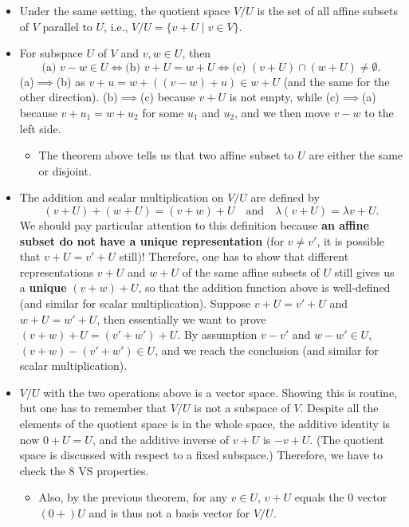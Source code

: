\documentclass{article}
\begin{document}
\begin{itemize}
\begin{itemize}
    \end{itemize}
    \item Under the same setting, the quotient space $V/U$ is the set of all affine subsets of $V$ parallel to $U$, i.e., $V/U = \{v+U \mid v \in V\}$.
    \item For subspace $U$ of $V$ and $v,w \in U$, then
        \begin{equation*}
            \text{(a) } v-w \in U \iff \text{(b) } v+U = w+U \iff \text{(c) } (v+U) \cap (w+U) \not= \emptyset.
        \end{equation*}
    (a)$\implies$(b) as $v+u = w+((v-w)+u) \in w+U$ (and the same for the other direction). (b)$\implies$(c) because $v+U$ is not empty, while (c)$\implies$(a) because $v+u_1=w+u_2$ for some $u_1$ and $u_2$, and we then move $v-w$ to the left side.
    \begin{itemize}
        \item The theorem above tells us that two affine subset to $U$ are either the same or  disjoint.
    \end{itemize}
    \item The addition and scalar multiplication on $V/U$ are defined by  $$(v+U)+(w+U) = (v+w)+U \quad \text{and} \quad \lambda(v+U) = \lambda v + U.$$ We should pay particular attention to this definition because \textbf{an affine subset do not have a unique representation} (for $v \not= v'$, it is possible that $v+U = v'+U$ still)! Therefore, one has to show that  different representations $v+U$ and $w+U$ of the same affine subsets of $U$ still gives us a \textbf{unique} $(v+w)+U$, so that the addition function above is well-defined (and similar for scalar multiplication). Suppose $v+U = v'+U$ and $w+U = w'+U$, then essentially we want to prove $(v+w)+U=(v'+w')+U$. By assumption $v-v'$ and $w-w' \in U$, $(v+w)-(v'+w') \in U$, and we reach the conclusion (and similar for scalar multiplication).
    \item $V/U$ with the two operations above is a vector space. Showing this is routine, but one has to remember that $V/U$ is not a subspace of $V$. Despite all the elements of the quotient space is in the whole space, the additive identity is now $0+U=U$, and the additive inverse of $v+U$ is $-v+U$. (The quotient space is discussed with respect to a fixed subspace.) Therefore, we have to check the 8 VS properties.
    \begin{itemize}
        \item Also, by the previous theorem, for any $v \in U$, $v+U$ equals the 0 vector $(0+)U$ and is thus not a basis vector for $V/U$.

\end{itemize}
\end{itemize}
\end{document}
